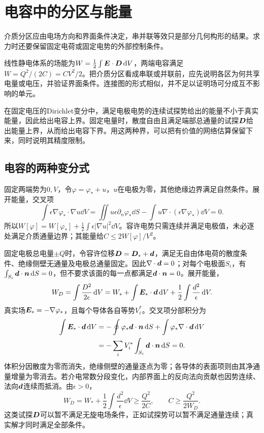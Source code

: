 \section{电容中的分区与能量}\label{sec:es4-capacitors}
介质分区应由电场方向和界面条件决定，串并联等效只是部分几何构形的结果。求力时还要保留固定电荷或固定电势的外部控制条件。

线性静电体系的场能为$W=\tfrac12\int\bm{E}\cdot\bm{D}\mathop{}\!\mathrm d V$，两端电容满足$W=Q^2/(2C)=CV^2/2$。把介质分区看成串联或并联前，应先说明各区为何共享电量或电压，并验证界面条件。连接图的形式相似，并不足以证明场可分成互不影响的单元。

在固定电压的Dirichlet变分中，满足电极电势的连续试探势给出的能量不小于真实能量，因此给出电容上界。固定电量时，散度自由且满足端部总通量的试探$\bm{D}$给出能量上界，从而给出电容下界。用这两种界，可以把有价值的网络估算保留下来，同时说明其精度限制。


\subsection{电容的两种变分式}
固定两端势为$0,V$，令$\varphi=\varphi_*+u$，$u$在电极为零，其他绝缘边界满足自然条件。展开能量，交叉项
\[\int\epsilon\nabla\varphi_*\cdot\nabla u\dd V
=\iint u\epsilon\partial_n\varphi_*\dd S-\int u\nabla\cdot(\epsilon\nabla\varphi_*)\dd V=0.
\]
所以$W[\varphi]=W[\varphi_*]+\tfrac12\int\epsilon|\nabla u|^2\dd V$。容许电势只需连续并满足电极值，未必逐处满足介质通量边界；其能量给$C\le2W[\varphi]/V^2$。

固定电极总电量$\pm Q$时，令容许位移$\bm{D}=\bm{D}_*+\bm{d}$，满足无自由体电荷的散度条件、绝缘侧壁无通量及电极总通量固定。因此$\nabla\cdot\bm{d}=0$；对每个电极面$S_i$，有$\int_{S_i}\bm{d}\cdot\bm{n}\mathop{}\!\mathrm d S=0$，但不要求该面的每一点都满足$\bm{d}\cdot\bm{n}=0$。展开能量，
\[W_D=\int\frac{D^2}{2\epsilon}\mathop{}\!\mathrm d V
=W_*+\int\bm{E}_*\cdot\bm{d}\mathop{}\!\mathrm d V
+\frac12\int\frac{d^2}{\epsilon}\mathop{}\!\mathrm d V.\]
真实场$\bm{E}_*=-\nabla\varphi_*$，且每个导体各自等势$V_i^*$。交叉项分部积分为
\[\begin{aligned}
\int\bm{E}_*\cdot\bm{d}\mathop{}\!\mathrm d V
&=-\oint\varphi_*\bm{d}\cdot\bm{n}\mathop{}\!\mathrm d S
+\int\varphi_*\nabla\cdot\bm{d}\mathop{}\!\mathrm d V\\
&=-\sum_iV_i^*\int_{S_i}\bm{d}\cdot\bm{n}\mathop{}\!\mathrm d S=0.
\end{aligned}\]
体积分因散度为零而消失，绝缘侧壁的通量逐点为零；各导体的表面项则由其净通量增量为零消去。若介电常数分段变化，内部界面上的反向法向贡献也因势连续、法向$\bm{d}$连续而抵消。由$\epsilon>0$，
\[W_D=W_*+\frac12\int\frac{d^2}{\epsilon}\dd V
\ge\frac{Q^2}{2C},\qquad C\ge\frac{Q^2}{2W_D}.\]
这类试探$\bm{D}$可以暂不满足无旋电场条件，正如试探势可以暂不满足通量连续；真实解才同时满足全部条件。

